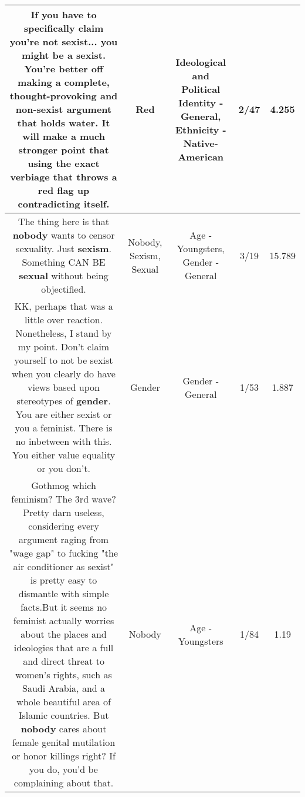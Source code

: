 \documentclass[11pt]{article}
\newlength\mylength
\begin{document}
\begin{center}
\begin{longtable}{|C{.65\mylength}|C{.30\mylength}|C{.12\mylength}|C{.12\mylength}|C{.12\mylength}|}
  \small If you have to specifically claim you're not sexist... you might be a sexist. You're better off making a complete, thought-provoking and non-sexist argument that holds water. It will make a much stronger point that using the exact verbiage that throws a \textbf{r\textbf{ed}} flag up contradicting itself.\normalsize   & Red &  Ideological and Political Identity - General, Ethnicity - Native-American & 2/47 & 4.255 \\  \hline
  \small The thing here is that \textbf{nobody} wants to censor sexuality. Just \textbf{sexism}. Something CAN BE \textbf{sexual} without being objectified.\normalsize   & Nobody, Sexism, Sexual & Age - Youngsters, Gender - General & 3/19 & 15.789 \\  \hline
  \small KK, perhaps that was a little over reaction. Nonetheless, I stand by my point. Don't claim yourself to not be sexist when you clearly do have views based upon stereotypes of \textbf{gender}. You are either sexist or you a feminist. There is no inbetween with this. You either value equality or you don't.\normalsize   & Gender & Gender - General & 1/53 & 1.887 \\  \hline
  \small Gothmog which feminism? The 3rd wave?Pretty darn useless, considering every argument raging from "wage gap" to fucking "the air conditioner as sexist" is pretty easy to dismantle with simple facts.But it seems no feminist actually worries about the places and ideologies that are a full and direct threat to women's rights, such as Saudi Arabia, and a whole beautiful area of Islamic countries. But \textbf{nobody} cares about female genital mutilation or honor killings right? If you do, you'd be complaining about that.\normalsize   & Nobody & Age - Youngsters & 1/84 & 1.19 \\  \hline

\end{longtable}
\end{center}
\end{document}
